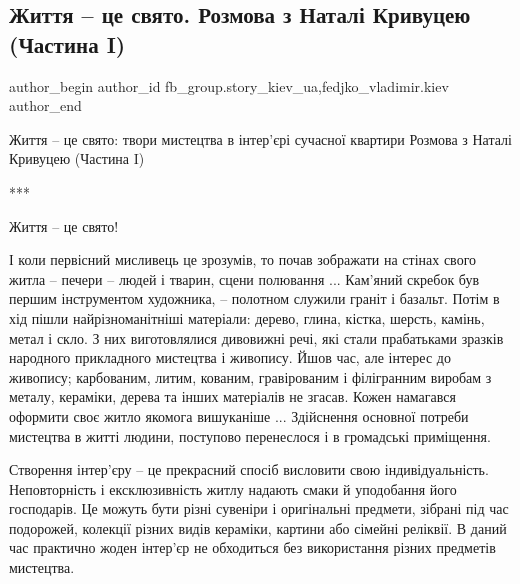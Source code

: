  
 
 
 
 
 
\subsection{Життя – це свято. Розмова з Наталі Кривуцею (Частина I)}
\label{sec:12_12_2021.fb.fb_group.story_kiev_ua.2.zhizn_svjato_krivuca_chast_pervaja}
 
\ifcmt
 author_begin
   author_id fb_group.story_kiev_ua,fedjko_vladimir.kiev
 author_end
\fi

Життя – це свято: твори мистецтва в інтер'єрі сучасної квартири
Розмова з Наталі Кривуцею (Частина I)

***

Життя – це свято!

І коли первісний мисливець це зрозумів, то почав зображати на стінах свого
житла – печери – людей і тварин, сцени полювання ... Кам'яний скребок був
першим інструментом художника, – полотном служили граніт і базальт. Потім в хід
пішли найрізноманітніші матеріали: дерево, глина, кістка, шерсть, камінь, метал
і скло. З них виготовлялися дивовижні речі, які стали прабатьками зразків
народного прикладного мистецтва і живопису. Йшов час, але інтерес до живопису;
карбованим, литим, кованим, гравірованим і філігранним виробам з металу,
кераміки, дерева та інших матеріалів не згасав. Кожен намагався оформити своє
житло якомога вишуканіше ... Здійснення основної потреби мистецтва в житті
людини, поступово перенеслося і в громадські приміщення.


Створення інтер'єру – це прекрасний спосіб висловити свою індивідуальність.
Неповторність і ексклюзивність житлу надають смаки й уподобання його
господарів. Це можуть бути різні сувеніри і оригінальні предмети, зібрані під
час подорожей, колекції різних видів кераміки, картини або сімейні реліквії. В
даний час практично жоден інтер'єр не обходиться без використання різних
предметів мистецтва.

